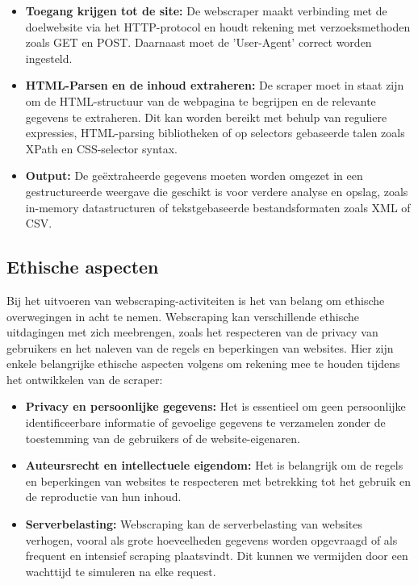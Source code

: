 \begin{itemize}
    \item \textbf{Toegang krijgen tot de site:} De webscraper maakt verbinding met de doelwebsite via het HTTP-protocol en houdt rekening met verzoeksmethoden zoals GET en POST. Daarnaast moet de 'User-Agent' correct worden ingesteld.
    \item \textbf{HTML-Parsen en de inhoud extraheren:} De scraper moet in staat zijn om de HTML-structuur van de webpagina te begrijpen en de relevante gegevens te extraheren. Dit kan worden bereikt met behulp van reguliere expressies, HTML-parsing bibliotheken of op selectors gebaseerde talen zoals XPath en CSS-selector syntax.
    \item \textbf{Output:} De geëxtraheerde gegevens moeten worden omgezet in een gestructureerde weergave die geschikt is voor verdere analyse en opslag, zoals in-memory datastructuren of tekstgebaseerde bestandsformaten zoals XML of CSV.
\end{itemize}

\subsection{Ethische aspecten}
\label{subsection:scraper-ethische-aspecten}
Bij het uitvoeren van webscraping-activiteiten is het van belang om ethische overwegingen in acht te nemen. Webscraping kan verschillende ethische uitdagingen met zich meebrengen, zoals het respecteren van de privacy van gebruikers en het naleven van de regels en beperkingen van websites. Hier zijn enkele belangrijke ethische aspecten volgens \autocite{scrape_ethics} om rekening mee te houden tijdens het ontwikkelen van de scraper: 

\begin{itemize}
    \item \textbf{Privacy en persoonlijke gegevens:} Het is essentieel om geen persoonlijke identificeerbare informatie of gevoelige gegevens te verzamelen zonder de toestemming van de gebruikers of de website-eigenaren.
    \item \textbf{Auteursrecht en intellectuele eigendom:} Het is belangrijk om de regels en beperkingen van websites te respecteren met betrekking tot het gebruik en de reproductie van hun inhoud.
    \item \textbf{Serverbelasting:} Webscraping kan de serverbelasting van websites verhogen, vooral als grote hoeveelheden gegevens worden opgevraagd of als frequent en intensief scraping plaatsvindt. Dit kunnen we vermijden door een wachttijd te simuleren na elke request. 
\end{itemize}

